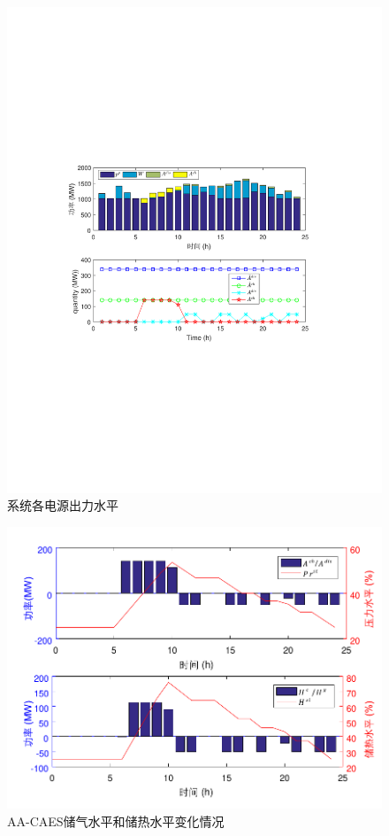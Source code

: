 \begin{figure}[H] %
  \centering
  \includegraphics[scale=0.75]{figures/Chap3-10-PAB-LoadGen.pdf}
  \caption{系统各电源出力水平}
  \label{fig:AA-CAES-PAB-LoadGen}
\end{figure}

\begin{figure}[H] %
  \centering
  \includegraphics[scale=0.75]{figures/Chap3-10-PAB-SOC.pdf}
  \caption{AA-CAES储气水平和储热水平变化情况}
  \label{fig:Part-Load-PAB-SOC}
\end{figure}

